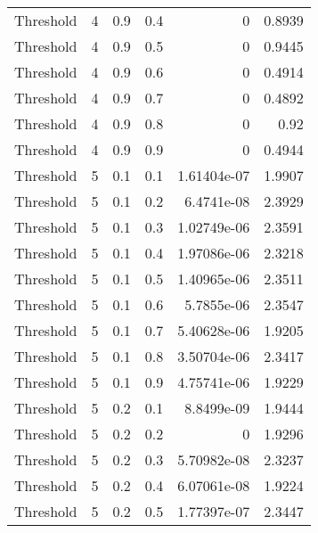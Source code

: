 \documentclass{article}
\begin{document}
\begin{longtable}[H]{lrrrrr}
 Threshold      &       4 &   0.9 &            0.4 &      0           &          0.8939 \\
 Threshold      &       4 &   0.9 &            0.5 &      0           &          0.9445 \\
 Threshold      &       4 &   0.9 &            0.6 &      0           &          0.4914 \\
 Threshold      &       4 &   0.9 &            0.7 &      0           &          0.4892 \\
 Threshold      &       4 &   0.9 &            0.8 &      0           &          0.92   \\
 Threshold      &       4 &   0.9 &            0.9 &      0           &          0.4944 \\
 Threshold      &       5 &   0.1 &            0.1 &      1.61404e-07 &          1.9907 \\
 Threshold      &       5 &   0.1 &            0.2 &      6.4741e-08  &          2.3929 \\
 Threshold      &       5 &   0.1 &            0.3 &      1.02749e-06 &          2.3591 \\
 Threshold      &       5 &   0.1 &            0.4 &      1.97086e-06 &          2.3218 \\
 Threshold      &       5 &   0.1 &            0.5 &      1.40965e-06 &          2.3511 \\
 Threshold      &       5 &   0.1 &            0.6 &      5.7855e-06  &          2.3547 \\
 Threshold      &       5 &   0.1 &            0.7 &      5.40628e-06 &          1.9205 \\
 Threshold      &       5 &   0.1 &            0.8 &      3.50704e-06 &          2.3417 \\
 Threshold      &       5 &   0.1 &            0.9 &      4.75741e-06 &          1.9229 \\
 Threshold      &       5 &   0.2 &            0.1 &      8.8499e-09  &          1.9444 \\
 Threshold      &       5 &   0.2 &            0.2 &      0           &          1.9296 \\
 Threshold      &       5 &   0.2 &            0.3 &      5.70982e-08 &          2.3237 \\
 Threshold      &       5 &   0.2 &            0.4 &      6.07061e-08 &          1.9224 \\
 Threshold      &       5 &   0.2 &            0.5 &      1.77397e-07 &          2.3447 \\

\end{longtable}
\end{document}

